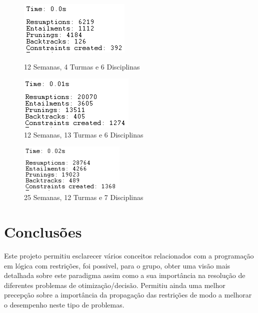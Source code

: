 \documentclass{llncs}
\begin{document}
\begin{figure}
\centering
    \begin{minipage}{0.45\textwidth}
    \centering
    \includegraphics[width=.9\textwidth]{12Semanas_4Turmas_6Disciplinas}
    \caption{12 Semanas, 4 Turmas e 6 Disciplinas}
    \end{minipage}\hfill
    \begin{minipage}{0.45\textwidth}
    \centering
   \includegraphics[width=.9\textwidth]{12Semanas_13Turmas_6Disciplinas}
\caption{12 Semanas, 13 Turmas e 6 Disciplinas}
    \end{minipage}\hfill
\end{figure}
\FloatBarrier

\begin{figure}
\centering
\includegraphics[width=0.45\textwidth]{25Semanas_12Turmas_7Disciplinas}
\caption{25 Semanas, 12 Turmas e 7 Disciplinas}
\label{reference}
\end{figure}
\FloatBarrier
\clearpage

\section{Conclusões}
Este projeto permitiu esclarecer vários conceitos relacionados com a programação em lógica com restrições, foi possivel, para o grupo, obter uma visão mais detalhada sobre este paradigma assim como a sua importância na resolução de diferentes problemas de otimização/decisão. Permitiu ainda uma melhor precepção sobre a importância da propagação das restrições de modo a melhorar o desempenho neste tipo de problemas.
\end{document}
